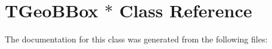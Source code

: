 \hypertarget{class_t_geo_b_box_01_5}{
\section{TGeoBBox $\ast$ Class Reference}
\label{class_t_geo_b_box_01_5}
}


The documentation for this class was generated from the following files: